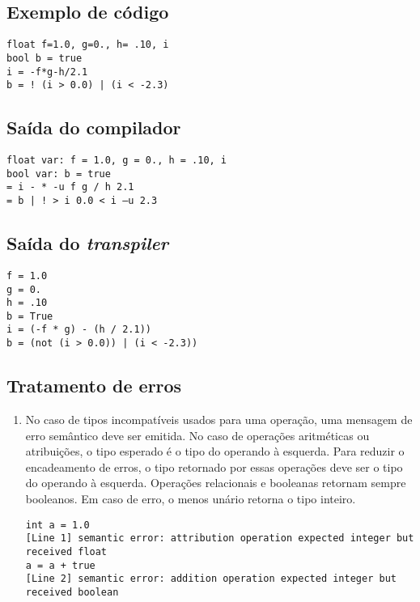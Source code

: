 \documentclass{article}
\newenvironment{smallenum}{
    \vspace{-1mm}
    \begin{enumerate}[label=\roman*.]
    \setlength{\parskip}{0pt}
    \setlength{\itemsep}{2pt}
}{
    \vspace{-2mm}
    \end{enumerate}
}
\begin{document}
\subsection{Exemplo de código}

\begin{verbatim}
float f=1.0, g=0., h= .10, i
bool b = true
i = -f*g-h/2.1
b = ! (i > 0.0) | (i < -2.3)
\end{verbatim}

\subsection{Saída do compilador}

\begin{verbatim}
float var: f = 1.0, g = 0., h = .10, i
bool var: b = true
= i - * -u f g / h 2.1
= b | ! > i 0.0 < i –u 2.3
\end{verbatim}

\subsection{Saída do \emph{transpiler}}

\begin{verbatim}
f = 1.0
g = 0.
h = .10
b = True
i = (-f * g) - (h / 2.1))
b = (not (i > 0.0)) | (i < -2.3))
\end{verbatim}

\subsection{Tratamento de erros}

\begin{smallenum}

\item No caso de tipos incompatíveis usados para uma operação, uma
    mensagem de erro semântico deve ser emitida. No caso de operações
    aritméticas ou atribuições, o tipo esperado é o tipo do operando à
    esquerda. Para reduzir o encadeamento de erros, o tipo retornado por
    essas operações deve ser o tipo do operando à esquerda. Operações
    relacionais e booleanas retornam sempre booleanos. Em caso de erro, o
    menos unário retorna o tipo inteiro.

\begin{verbatim}
int a = 1.0
[Line 1] semantic error: attribution operation expected integer but received float
a = a + true
[Line 2] semantic error: addition operation expected integer but received boolean
\end{verbatim}

\end{smallenum}
\end{document}
